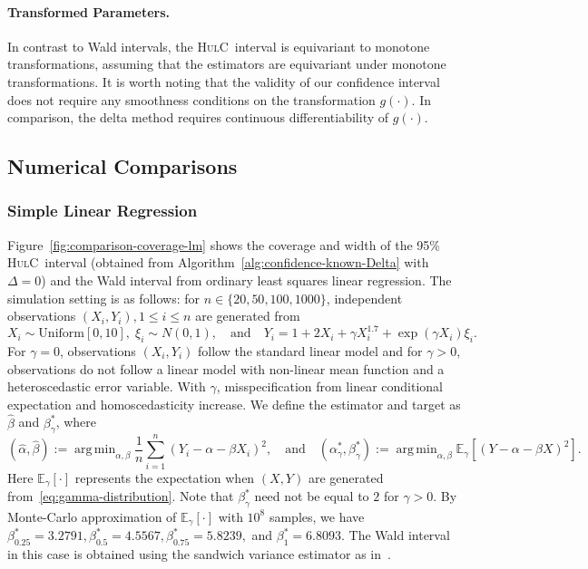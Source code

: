 \documentclass{article}
\newcommand{\hulc}{\textsc{HulC}~}
\numberwithin{myalgctr}{section}
\DeclareMathOperator*{\argmin}{arg\,min}
\begin{document}
\paragraph{Transformed Parameters.} 
In contrast to Wald intervals,
the \hulc interval
is equivariant to
monotone transformations{\color{black}, assuming that the estimators are equivariant under monotone transformations}. 
It is worth noting that the validity of our confidence interval does
not require any smoothness conditions on the transformation
$g(\cdot).$ In comparison, the delta method requires continuous
differentiability of $g(\cdot)$.
\subsection{Numerical Comparisons}
\subsubsection{Simple Linear Regression}
Figure~\ref{fig:comparison-coverage-lm}
shows the coverage and width of the
95\% \hulc interval
{\color{black}(obtained from Algorithm~\ref{alg:confidence-known-Delta} with $\Delta = 0$)}
and the Wald interval
from ordinary least squares linear
regression. The simulation setting is as follows: for $n \in \{20, 50,
100, 1000\}$, independent observations $(X_i, Y_i), 1\le i\le n$ are
generated from
\begin{equation}\label{eq:gamma-distribution}
X_i\sim \mbox{Uniform}[0, 10],\;\xi_i\sim N(0, 1),\quad\mbox{and}\quad Y_i = 1 + 2X_i + \gamma X_i^{1.7} + \exp(\gamma X_i)\xi_i.
\end{equation}
For $\gamma = 0$, observations $(X_i, Y_i)$ follow the standard linear model and for $\gamma > 0$, observations do not follow a linear model with non-linear mean function and a heteroscedastic error variable. {\color{black}With $\gamma$, misspecification from linear conditional expectation and homoscedasticity increase}. We define the estimator and target as $\widehat{\beta}$ and $\beta^*_{\gamma}$, where
\[
(\widehat{\alpha}, \widehat{\beta}) := \argmin_{\alpha,\beta}\frac{1}{n}\sum_{i=1}^n (Y_i - \alpha - \beta X_i)^2,\quad\mbox{and}\quad (\alpha^*_{\gamma}, \beta^*_{\gamma}) := \argmin_{\alpha,\beta}\mathbb{E}_{\gamma}[(Y - \alpha - \beta X)^2].
\]
Here $\mathbb{E}_{\gamma}[\cdot]$ represents the expectation when $(X, Y)$ are generated from~\eqref{eq:gamma-distribution}.
Note that $\beta^*_{\gamma}$ need not be equal to $2$ for $\gamma > 0$. By Monte-Carlo approximation of $\mathbb{E}_{\gamma}[\cdot]$ with $10^8$ samples, we have $\beta_{0.25}^* = 3.2791, \beta^*_{0.5} = 4.5567, \beta^*_{0.75} = 5.8239,$ and $\beta^*_{1} = 6.8093$. The Wald interval in this case is obtained using the sandwich variance estimator as in~\cite{buja2019models}.
\end{document}
